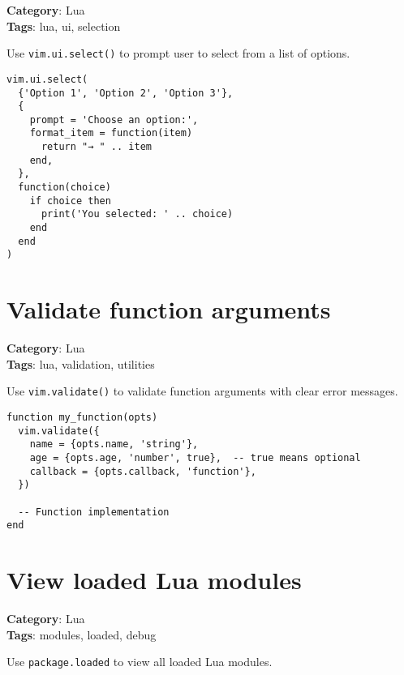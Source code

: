 {{{{{{{\textbf{Category}: Lua\\ \textbf{Tags}: lua, ui, selection
\vspace{0.5cm}

Use {\footnotesize \Verb§vim.ui.select()§} to prompt user to select from a list of options.

\begin{Exa*}{}
\begin{Verbatim}[fontsize=\footnotesize, breaklines, breakanywhere]
vim.ui.select(
  {'Option 1', 'Option 2', 'Option 3'},
  {
    prompt = 'Choose an option:',
    format_item = function(item)
      return "→ " .. item
    end,
  },
  function(choice)
    if choice then
      print('You selected: ' .. choice)
    end
  end
)
\end{Verbatim}
\end{Exa*}

\section{Validate function arguments}

\textbf{Category}: Lua\\ \textbf{Tags}: lua, validation, utilities
\vspace{0.5cm}

Use {\footnotesize \Verb§vim.validate()§} to validate function arguments with clear error messages.

\begin{Exa*}{}
\begin{Verbatim}[fontsize=\footnotesize, breaklines, breakanywhere]
function my_function(opts)
  vim.validate({
    name = {opts.name, 'string'},
    age = {opts.age, 'number', true},  -- true means optional
    callback = {opts.callback, 'function'},
  })

  -- Function implementation
end
\end{Verbatim}
\end{Exa*}

\section{View loaded Lua modules}

\textbf{Category}: Lua\\ \textbf{Tags}: modules, loaded, debug
\vspace{0.5cm}

Use {\footnotesize \Verb§package.loaded§} to view all loaded Lua modules.

}}}}}}}
